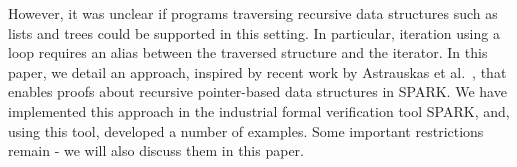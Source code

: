 \documentclass[runningheads]{llncs}
\begin{document}
However, it was unclear if programs traversing recursive data structures such as lists and trees %
could be supported in this setting. In particular, iteration using a loop requires an alias between the traversed structure and the iterator.
In this paper, we detail an approach, inspired by recent work by Astrauskas et al.~\cite{astrauskas2019leveraging}, that enables proofs about recursive pointer-based data structures in SPARK. We have implemented this approach in the industrial formal verification tool SPARK, and, using this tool, developed a number of examples. Some important restrictions remain - we will also discuss them in this paper.
\end{document}
